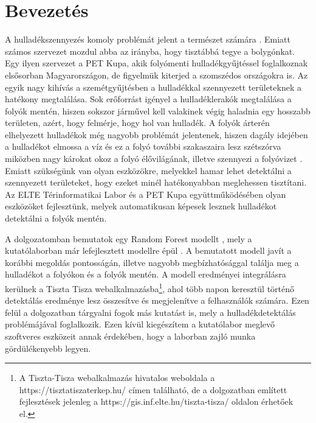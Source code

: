 \chapter{Bevezetés}
\label{ch:intro}

A hulladékszennyezés komoly problémát jelent a természet számára \cite{kibria2023PlasticWaste}. Emiatt számos szervezet mozdul abba az irányba, hogy tisztábbá tegye a bolygónkat. Egy ilyen szervezet a PET Kupa, akik folyómenti hulladékgyűjtéssel foglalkoznak elsősorban Magyarországon, de figyelmük kiterjed a szomszédos országokra is. Az egyik nagy kihívás a szemétgyűjtésben a hulladékkal szennyezett területeknek a hatékony megtalálása. Sok erőforrást igényel a hulladéklerakók megtalálása a folyók mentén, hiszen sokszor járművel kell valakinek végig haladnia egy hosszabb területen, azért, hogy felmérje, hogy hol van hulladék. A folyók árterén elhelyezett hulladékok még nagyobb problémát jelentenek, hiszen dagály idejében a hulladékot elmossa a víz és ez a folyó további szakaszaira lesz szétszórva miközben nagy károkat okoz a folyó élővilágának, illetve szennyezi a folyóvizet \cite{nyberg2023, vanEmmerik2023}. Emiatt szükségünk van olyan eszközökre, melyekkel hamar lehet detektálni a szennyezett területeket, hogy ezeket minél hatékonyabban meglehessen tisztítani. Az ELTE Térinformatikai Labor és a PET Kupa együttműködésében olyan eszközöket fejlesztünk, melyek automatikusan képesek lesznek hulladékot detektálni a folyók mentén.

A dolgozatomban bemutatok egy Random Forest modellt \cite{breiman2001}, mely a kutatólaborban már lefejlesztett modellre épül \cite{magyar2023}. A bemutatott modell javít a korábbi megoldás pontosságán, illetve nagyobb megbízhatósággal találja meg a hulladékot a folyókon és a folyók mentén. A modell eredményei integrálásra kerülnek a Tiszta Tisza webalkalmazásba\footnote{A Tiszta-Tisza webalkalmazás hivatalos weboldala a https://tisztatiszaterkep.hu/ címen található, de a dolgozatban említett fejlesztések jelenleg a https://gis.inf.elte.hu/tiszta-tisza/ oldalon érhetőek el.}, ahol több napon keresztül történő detektálás eredménye lesz összesítve és megjelenítve a felhasználók számára. Ezen felül a dolgozatban tárgyalni fogok más kutatást is, mely a hulladékdetektálás problémájával foglalkozik. Ezen kívül kiegészítem a kutatólabor meglevő szoftveres eszközeit annak érdekében, hogy a laborban zajló munka gördülékenyebb legyen.

